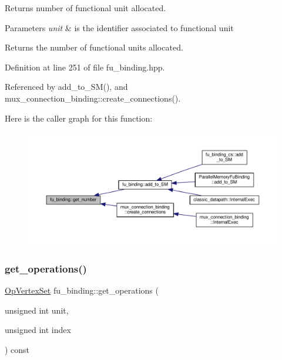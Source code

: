 Returns number of functional unit allocated. 


\begin{DoxyParams}{Parameters}
{\em unit} & is the identifier associated to functional unit \\
\hline
\end{DoxyParams}
\begin{DoxyReturn}{Returns}
the number of functional units allocated. 
\end{DoxyReturn}


Definition at line 251 of file fu\+\_\+binding.\+hpp.



Referenced by add\+\_\+to\+\_\+\+S\+M(), and mux\+\_\+connection\+\_\+binding\+::create\+\_\+connections().

Here is the caller graph for this function\+:
\nopagebreak
\begin{figure}[H]
\begin{center}
\leavevmode
\includegraphics[width=350pt]{d8/d04/classfu__binding_ae55092e8c48ea5924dfd46ea56141ff8_icgraph}
\end{center}
\end{figure}
\mbox{\label{classfu__binding_a478de19203821bdd6af592a06306a34e}} 
\subsubsection{\texorpdfstring{get\+\_\+operations()}{get\_operations()}}
{\footnotesize\ttfamily \hyperlink{classOpVertexSet}{Op\+Vertex\+Set} fu\+\_\+binding\+::get\+\_\+operations (\begin{DoxyParamCaption}\item[{unsigned int}]{unit,  }\item[{unsigned int}]{index }\end{DoxyParamCaption}) const}



